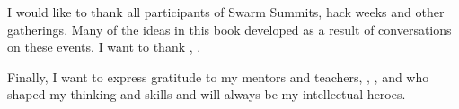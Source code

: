 I would like to thank all participants of Swarm Summits, hack weeks and other gatherings. Many of the ideas in this book developed as a result of conversations on these events. I want to thank , .

Finally, I want to express gratitude to my mentors and teachers, , ,  and  who shaped my thinking and skills and will always be my intellectual heroes.

